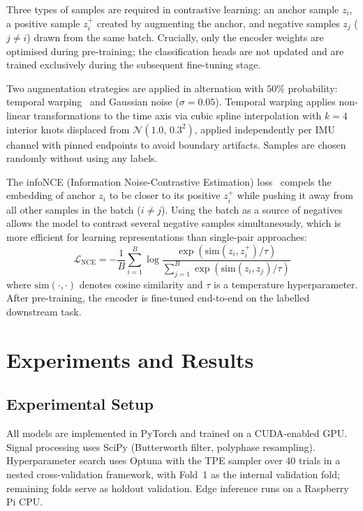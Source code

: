 \documentclass[pmlr]{jmlr}
\begin{document}
Three types of samples are required in contrastive learning: an anchor
sample $z_i$, a positive sample $z_i^+$ created by augmenting the
anchor, and negative samples $z_j$ ($j \neq i$) drawn from the same
batch. Crucially, only the encoder weights are optimised during
pre-training; the classification heads are not updated and are trained
exclusively during the subsequent fine-tuning stage.

Two augmentation strategies are applied in alternation with $50\%$
probability: temporal warping~\citep{ref} and Gaussian noise
($\sigma{=}0.05$). Temporal warping applies non-linear transformations
to the time axis via cubic spline interpolation with $k{=}4$ interior
knots displaced from $\mathcal{N}(1.0,\,0.3^2)$, applied
independently per IMU channel with pinned endpoints to avoid boundary
artifacts. Samples are chosen randomly without using any labels.

The infoNCE (Information Noise-Contrastive Estimation)
loss~\citep{ref} compels the embedding of anchor $z_i$ to be closer
to its positive $z_i^+$ while pushing it away from all other samples
in the batch ($i \neq j$). Using the batch as a source of negatives
allows the model to contrast several negative samples simultaneously,
which is more efficient for learning representations than single-pair
approaches:
\begin{equation}
\mathcal{L}_{\mathrm{NCE}} =
- \frac{1}{B} \sum_{i=1}^{B}
\log \frac{
\exp\!\left(\mathrm{sim}(z_i, z_i^+)/\tau\right)
}{
\sum_{j=1}^{B} \exp\!\left(\mathrm{sim}(z_i, z_j)/\tau\right)
}
\end{equation}
where $\mathrm{sim}(\cdot,\cdot)$ denotes cosine similarity and
$\tau$ is a temperature hyperparameter. After pre-training, the
encoder is fine-tuned end-to-end on the labelled downstream task.


\section{Experiments and Results}
\label{sec:experiments}

\subsection{Experimental Setup}

All models are implemented in PyTorch and trained on a CUDA-enabled
GPU. Signal processing uses SciPy (Butterworth filter, polyphase
resampling). Hyperparameter search uses Optuna with the TPE sampler
over 40 trials in a nested cross-validation framework, with Fold~1 as
the internal validation fold; remaining folds serve as holdout
validation. Edge inference runs on a Raspberry Pi CPU.
\end{document}
